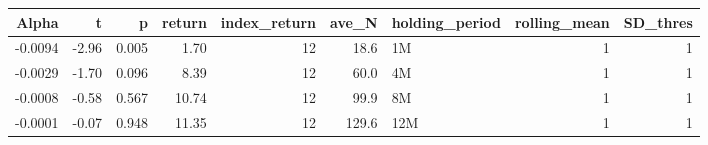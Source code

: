 \begin{table}[ht]
\centering
\begin{tabular}{rrrrrrlrr}
  \hline
Alpha & t & p & return & index\_return & ave\_N & holding\_period & rolling\_mean & SD\_thres \\ 
  \hline
-0.0094 & -2.96 & 0.005 & 1.70 & 12 & 18.6 & 1M &  1 &  1 \\ 
  -0.0029 & -1.70 & 0.096 & 8.39 & 12 & 60.0 & 4M &  1 &  1 \\ 
  -0.0008 & -0.58 & 0.567 & 10.74 & 12 & 99.9 & 8M &  1 &  1 \\ 
  -0.0001 & -0.07 & 0.948 & 11.35 & 12 & 129.6 & 12M &  1 &  1 \\ 
   \hline
\end{tabular}
\end{table}

